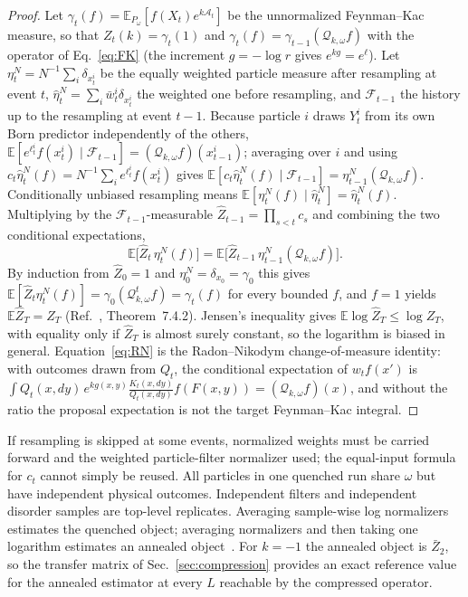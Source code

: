 \documentclass[aps,prx,reprint,superscriptaddress,nobibnotes,longbibliography]{revtex4-2}
\theoremstyle{remark}
\newcommand{\E}{\mathbb E}
\begin{document}
\begin{proof}
Let $\gamma_t(f)=\E_{P_\omega}[f(X_t)e^{k\mathcal A_t}]$ be the unnormalized Feynman--Kac measure, so that $Z_t(k)=\gamma_t(1)$ and $\gamma_t(f)=\gamma_{t-1}(\mathcal Q_{k,\omega}f)$ with the operator of Eq.~\eqref{eq:FK} (the increment $g=-\log r$ gives $e^{kg}=e^{\ell}$).  Let $\eta_t^N=N^{-1}\sum_i\delta_{x_t^i}$ be the equally weighted particle measure after resampling at event $t$, $\widehat\eta_t^N=\sum_i\bar w_t^i\delta_{x_t^i}$ the weighted one before resampling, and $\mathcal F_{t-1}$ the history up to the resampling at event $t-1$.  Because particle $i$ draws $Y_t^i$ from its own Born predictor independently of the others, $\E[e^{\ell_t^i}f(x_t^i)\mid\mathcal F_{t-1}]=(\mathcal Q_{k,\omega}f)(x_{t-1}^i)$; averaging over $i$ and using $c_t\widehat\eta_t^N(f)=N^{-1}\sum_ie^{\ell_t^i}f(x_t^i)$ gives $\E[c_t\widehat\eta_t^N(f)\mid\mathcal F_{t-1}]=\eta_{t-1}^N(\mathcal Q_{k,\omega}f)$.  Conditionally unbiased resampling means $\E[\eta_t^N(f)\mid\widehat\eta_t^N]=\widehat\eta_t^N(f)$.  Multiplying by the $\mathcal F_{t-1}$-measurable $\widehat Z_{t-1}=\prod_{s<t}c_s$ and combining the two conditional expectations,
\begin{equation*}
 \E\bigl[\widehat Z_t\,\eta_t^N(f)\bigr]=\E\bigl[\widehat Z_{t-1}\,\eta_{t-1}^N(\mathcal Q_{k,\omega}f)\bigr].
\end{equation*}
By induction from $\widehat Z_0=1$ and $\eta_0^N=\delta_{x_0}=\gamma_0$ this gives $\E[\widehat Z_t\eta_t^N(f)]=\gamma_0(\mathcal Q_{k,\omega}^tf)=\gamma_t(f)$ for every bounded $f$, and $f=1$ yields $\E\widehat Z_T=Z_T$ (Ref.~\cite{DelMoral2004}, Theorem~7.4.2).  Jensen's inequality gives $\E\log\widehat Z_T\le\log Z_T$, with equality only if $\widehat Z_T$ is almost surely constant, so the logarithm is biased in general.  Equation~\eqref{eq:RN} is the Radon--Nikodym change-of-measure identity: with outcomes drawn from $Q_t$, the conditional expectation of $w_tf(x')$ is $\int Q_t(x,dy)\,e^{kg(x,y)}\frac{K_t(x,dy)}{Q_t(x,dy)}f(F(x,y))=(\mathcal Q_{k,\omega}f)(x)$, and without the ratio the proposal expectation is not the target Feynman--Kac integral.
\end{proof}

If resampling is skipped at some events, normalized weights must be carried forward and the weighted particle-filter normalizer used; the equal-input formula for $c_t$ cannot simply be reused.  All particles in one quenched run share $\omega$ but have independent physical outcomes.  Independent filters and independent disorder samples are top-level replicates.  Averaging sample-wise log normalizers estimates the quenched object; averaging normalizers and then taking one logarithm estimates an annealed object~\cite{Giardina2006,Tailleur2009}.  For $k=-1$ the annealed object is $\bar Z_2$, so the transfer matrix of Sec.~\ref{sec:compression} provides an exact reference value for the annealed estimator at every $L$ reachable by the compressed operator.
\end{document}
